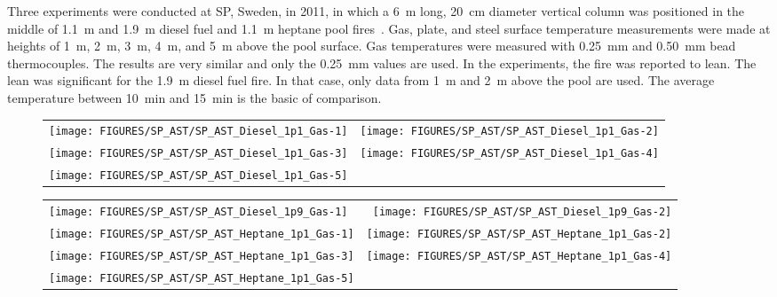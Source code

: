 \clearpage

Three experiments were conducted at SP, Sweden, in 2011, in which a 6~m long, 20~cm diameter vertical column was positioned in the middle of 1.1~m and 1.9~m diesel fuel and 1.1~m heptane pool fires~\cite{Sjostrom:AST}. Gas, plate, and steel surface temperature measurements were made at heights of 1~m, 2~m, 3~m, 4~m, and 5~m above the pool surface. Gas temperatures were measured with 0.25~mm and 0.50~mm bead thermocouples. The results are very similar and only the 0.25~mm values are used. In the experiments, the fire was reported to lean. The lean was significant for the 1.9~m diesel fuel fire. In that case, only data from 1~m and 2~m above the pool are used. The average temperature between 10~min and 15~min is the basic of comparison.

\begin{figure}[h!]
\begin{tabular*}{\textwidth}{l@{\extracolsep{\fill}}r}
\texttt{[image: FIGURES/SP\_AST/SP\_AST\_Diesel\_1p1\_Gas-1]}   &  \texttt{[image: FIGURES/SP\_AST/SP\_AST\_Diesel\_1p1\_Gas-2]}    \\
\texttt{[image: FIGURES/SP\_AST/SP\_AST\_Diesel\_1p1\_Gas-3]}   &  \texttt{[image: FIGURES/SP\_AST/SP\_AST\_Diesel\_1p1\_Gas-4]}     \\
\texttt{[image: FIGURES/SP\_AST/SP\_AST\_Diesel\_1p1\_Gas-5]}   &
\end{tabular*}
\label{SP_Diesel_1p1_Gas}
\end{figure}

\newpage

\begin{figure}[p]
\begin{tabular*}{\textwidth}{l@{\extracolsep{\fill}}r}
\texttt{[image: FIGURES/SP\_AST/SP\_AST\_Diesel\_1p9\_Gas-1]}   &  \texttt{[image: FIGURES/SP\_AST/SP\_AST\_Diesel\_1p9\_Gas-2]}    \\
\texttt{[image: FIGURES/SP\_AST/SP\_AST\_Heptane\_1p1\_Gas-1]}  &  \texttt{[image: FIGURES/SP\_AST/SP\_AST\_Heptane\_1p1\_Gas-2]}    \\
\texttt{[image: FIGURES/SP\_AST/SP\_AST\_Heptane\_1p1\_Gas-3]}  &  \texttt{[image: FIGURES/SP\_AST/SP\_AST\_Heptane\_1p1\_Gas-4]}     \\
\texttt{[image: FIGURES/SP\_AST/SP\_AST\_Heptane\_1p1\_Gas-5]}  &
\end{tabular*}
\label{SP_Diesel_1p9_Gas}
\end{figure}

\clearpage

